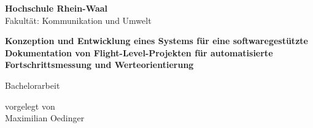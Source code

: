 \begin{titlepage}
    \begin{center}
        \vspace{0.5cm}
        \Large{
            \textbf{Hochschule Rhein-Waal}\\
            Fakultät: Kommunikation und Umwelt
        }

        \vspace{3cm}
        \vfill
        \LARGE{
            \textbf{Konzeption und Entwicklung eines Systems für eine softwaregestützte Dokumentation von Flight-Level-Projekten für automatisierte Fortschrittsmessung und Werteorientierung 
        }}
        \vfill

        \vspace{1.5cm}
        \LARGE{Bachelorarbeit}
        
        \vfill

        \vspace{1cm}
        \large{vorgelegt von \\}
        \LARGE{Maximilian Oedinger}
    \end{center}
\end{titlepage}